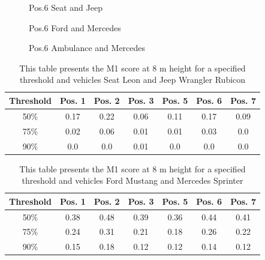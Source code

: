 \begin{figure}[!htb]
  
  \caption{Pos.6 Seat and Jeep}\label{fig:pos6_8m}
\endminipage\hfill
{}
  
  \caption{Pos.6 Ford and Mercedes}\label{fig:pos6_ford_merc}
\endminipage\hfill
\end{figure}

\begin{figure}[!htb]
    
  \caption{Pos.6 Ambulance and Mercedes}\label{fig:pos6_amb_merc}
\endminipage\hfill
\end{figure}


\begin{table}[h]
\caption{This table presents the M1 score at 8 m height for a specified threshold and vehicles Seat Leon and Jeep Wrangler Rubicon\label{tab:jeep_seat_threshold}}
\centering
    \begin{tabular}{ | c | c | c | c | c | c | c |}
    \hline
    Threshold & Pos. 1 & Pos. 2 & Pos. 3 & Pos. 5 & Pos. 6 & Pos. 7 \\ \hline
    50\% & 0.17 & 0.22 & 0.06 & 0.11 & 0.17 & 0.09\\ \hline
    75\% & 0.02 & 0.06 & 0.01 & 0.01 & 0.03 & 0.0\\ \hline
    90\% & 0.0 & 0.0 & 0.01 & 0.0 & 0.0 & 0.0\\ \hline
    \end{tabular}
\end{table}

\begin{table}[h]
\caption{This table presents the M1 score at 8 m height for a specified threshold and vehicles Ford Mustang and Mercedes Sprinter\label{tab:ford_merc_threshold}}
\centering
    \begin{tabular}{ | c | c | c | c | c | c | c |}
    \hline
    Threshold & Pos. 1 & Pos. 2 & Pos. 3 & Pos. 5 & Pos. 6 & Pos. 7 \\ \hline
    50\% & 0.38 & 0.48 & 0.39 & 0.36 & 0.44 & 0.41\\ \hline
    75\% & 0.24 & 0.31 & 0.21 & 0.18 & 0.26 & 0.22\\ \hline
    90\% & 0.15 & 0.18 & 0.12 & 0.12 & 0.14 & 0.12\\ \hline
    \end{tabular}
\end{table}

